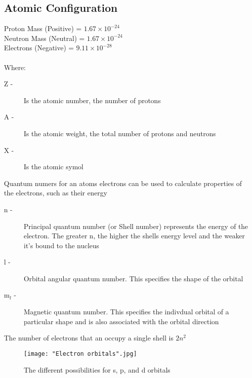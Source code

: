 \documentclass[a4paper, 12pt]{article}
\begin{document}
		\subsection*{Atomic Configuration}
			Proton Mass (Positive) = $1.67\times10^{-24}$ \\
			Neutron Mass (Neutral) = $1.67\times10^{-24}$ \\
			Electrons (Negative) = $9.11\times10^{-28}$ \\
			
			 \\
			Where: \begin{description}
				\item [Z - ] Is the atomic number, the number of protons
				\item [A - ] Is the atomic weight, the total number of protons and neutrons
				\item [X - ] Is the atomic symol
			\end{description} 
			
	
			
			Quantum numers for an atoms electrons can be used to calculate properties of the electrons, such as their energy
			\begin{description}
				\item [n - ] Principal quantum number (or Shell number) represents the energy of the electron. The greater n, the higher the shells energy level and the weaker it's bound to the nucleus
				\item [l - ] Orbital angular quantum number. This specifies the shape of the orbital
				\item [m$_l$ - ] Magnetic quantum number. This specifies the indivdual orbital of a particular shape and is also associated with the orbital direction
			\end{description}
			
			The number of electrons that an occupy a single shell is $2n^2$ 		

			\begin{figure}[t]
				\texttt{[image: "Electron orbitals".jpg]} 
				\caption{The different possibilities for s, p, and d orbitals}
			\end{figure}
			
\end{document}
